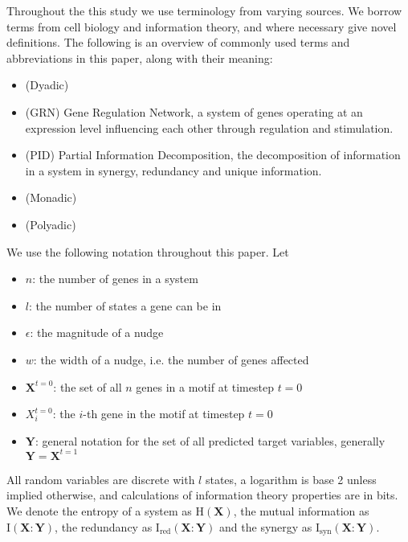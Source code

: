 \documentclass[../main.tex]{subfiles}
\begin{document}
Throughout the this study we use terminology from varying sources.
We borrow terms from cell biology and information theory, and where necessary give novel definitions.
The following is an overview of commonly used terms and abbreviations in this paper, along with their meaning:

\begin{itemize}
\item[] (Dyadic)
\item[] (GRN) Gene Regulation Network, a system of genes operating at an expression level influencing each other through regulation and stimulation.
\item[] (PID) Partial Information Decomposition, the decomposition of information in a system in synergy, redundancy and unique information.
\item[] (Monadic)
\item[] (Polyadic)
\end{itemize}

We use the following notation throughout this paper. Let
\begin{itemize}
\item[] $n$: the number of genes in a system
\item[] $l$: the number of states a gene can be in
\item[] $\epsilon$: the magnitude of a nudge
\item[] $w$: the width of a nudge, i.e. the number of genes affected
\item[] $\mathbf{X}^{t=0}$: the set of all $n$ genes in a motif at timestep $t=0$
\item[] $X_i^{t=0}$: the $i$-th gene in the motif at timestep $t=0$
\item[] $\mathbf{Y}$: general notation for the set of all predicted target variables, generally $\mathbf{Y} = \mathbf{X}^{t=1}$
\end{itemize}
All random variables are discrete with $l$ states, a logarithm is base 2 unless implied otherwise, and calculations of information theory properties are in bits.
We denote the entropy of a system as $\mathrm{H}(\mathbf{X})$, the mutual information as $\mathrm{I}(\mathbf{X}:\mathbf{Y})$, the redundancy as $\mathrm{I}_\mathrm{red}(\mathbf{X}:\mathbf{Y})$ and the synergy as $\mathrm{I}_\mathrm{syn}(\mathbf{X}:\mathbf{Y})$.
\end{document}
